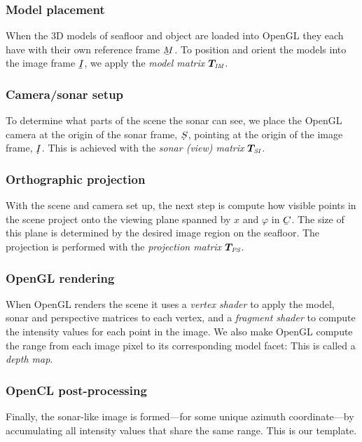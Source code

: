 \subsubsection{Model placement}

When the 3D models of seafloor and object are loaded into OpenGL they each have with their own reference frame $\protect\ubar{M}$. To position and orient the models into the image frame $\protect\ubar{I}$, we apply the \emph{model matrix} $\mat{T}_\textit{\tiny\!IM}$.

\subsubsection{Camera/sonar setup}

To determine what parts of the scene the sonar can see, we place the OpenGL camera at the origin of the sonar frame, $\protect\udot{S}$, pointing at the origin of the image frame, $\protect\udot{I}$. This is achieved with the \emph{sonar (view) matrix} $\mat{T}_\textit{\tiny\!SI}$.

\subsubsection{Orthographic projection}

With the scene and camera set up, the next step is compute how visible points in the scene project onto the viewing plane spanned by $x$ and $\varphi$ in $\ubar{C}$. The size of this plane is determined by the desired image region on the seafloor. The projection is performed with the \emph{projection matrix} $\mat{T}_\textit{\tiny\!PS}$.

\subsubsection{OpenGL rendering}

When OpenGL renders the scene it uses a \emph{vertex shader} to apply the model, sonar and perspective matrices to each vertex, and a \emph{fragment shader} to compute the intensity values for each point in the image. We also make OpenGL compute the range from each image pixel to its corresponding model facet: This is called a \emph{depth map}.

\subsubsection{OpenCL post-processing}

Finally, the sonar-like image is formed---for some unique azimuth coordinate---by accumulating all intensity values that share the same range. This is our template. %



